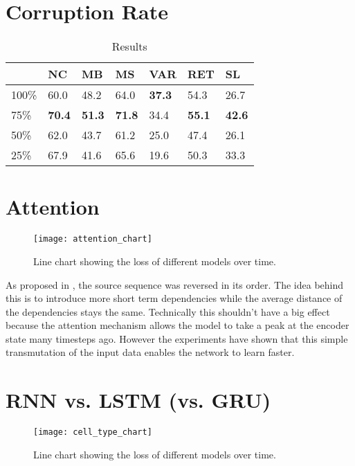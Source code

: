 \section{Corruption Rate}

\begin{table}[h]
\begin{tabular}{ | m{2cm} | m{1cm} | m{1cm} | m{1cm} | m{1cm} | m{1cm} | m{1cm} | }
  \hline
  & NC & MB & MS & VAR & RET & SL \\
  \hline
  \hline
  100\% & 60.0 & 48.2 & 64.0 & \textbf{37.3} & 54.3 & 26.7 \\
  \hline
  75\% & \textbf{70.4} & \textbf{51.3} & \textbf{71.8} & 34.4 & \textbf{55.1} & \textbf{42.6} \\
  \hline
  50\% & 62.0 & 43.7 & 61.2 & 25.0 & 47.4 & 26.1 \\
  \hline
  25\% & 67.9 & 41.6 & 65.6 & 19.6 & 50.3 & 33.3 \\
  \hline
\end{tabular}
\caption{Results}
\label{result_table}
\end{table}

\section{Attention}

\begin{figure}[p]
\centering
\texttt{[image: attention\_chart]}
\caption{Line chart showing the loss of different models over time.}
\label{attention_chart}
\end{figure}

As proposed in \cite{seq2seq}, the source sequence was reversed in its order. The idea behind this is to introduce more short term dependencies while the average distance of the dependencies stays the same. Technically this shouldn't have a big effect because the attention mechanism allows the model to take a peak at the encoder state many timesteps ago. However the experiments have shown that this simple transmutation of the input data enables the network to learn faster.

\section{RNN vs. LSTM (vs. GRU)}

\begin{figure}[p]
\centering
\texttt{[image: cell\_type\_chart]}
\caption{Line chart showing the loss of different models over time.}
\label{cell_type_chart}
\end{figure}

